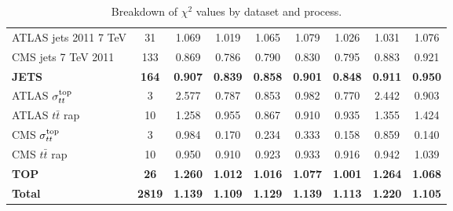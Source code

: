 \begin{table}[H]
\begin{center}
{\begin{tabular}{lcccccccc}
\midrule
ATLAS jets 2011 7 TeV                   &   31 & 1.069 & 1.019 & 1.065 & 1.079 & 1.026 & 1.031 & 1.076 \\
CMS jets 7 TeV 2011                     &  133 & 0.869 & 0.786 & 0.790 & 0.830 & 0.795 & 0.883 & 0.921 \\
\midrule
\bf JETS                                &  \bf 164 & \bf 0.907 & \bf 0.839 & \bf 0.858 & \bf 0.901 & \bf 0.848 & \bf 0.911 & \bf 0.950 \\
\midrule
ATLAS $\sigma_{tt}^{\rm top}$              &    3 & 2.577 & 0.787 & 0.853 & 0.982 & 0.770 & 2.442 & 0.903 \\
ATLAS $t\bar{t}$ rap                    &   10 & 1.258 & 0.955 & 0.867 & 0.910 & 0.935 & 1.355 & 1.424 \\
CMS $\sigma_{tt}^{\rm top}$                &    3 & 0.984 & 0.170 & 0.234 & 0.333 & 0.158 & 0.859 & 0.140 \\
CMS $t\bar{t}$ rap                      &   10 & 0.950 & 0.910 & 0.923 & 0.933 & 0.916 & 0.942 & 1.039 \\ 
\midrule
\bf TOP                                 &  \bf  26 & \bf 1.260 & \bf 1.012 & \bf 1.016 & \bf 1.077 & \bf 1.001 & \bf 1.264 & \bf 1.068 \\ 
\midrule
\bf Total                               & \bf 2819 & \bf 1.139 & \bf 1.109 & \bf 1.129 & \bf 1.139 & \bf 1.113 & \bf 1.220 & \bf 1.105 \\
\bottomrule
\end{tabular}}
\end{center}
\caption{Breakdown of $\chi^2$ values by dataset and process. 
  \label{table:chi2table_covth_global_nlo}
}
  \end{table}
